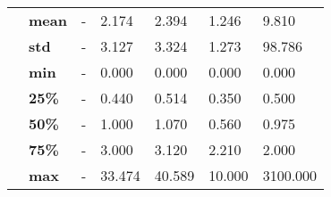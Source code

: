 \begin{tabularx}{\linewidth}{lXXXXXX}
           & \textbf{mean} &             - &      2.174 &       2.394 &              1.246 &     9.810 \\
           & \textbf{std} &             - &      3.127 &       3.324 &              1.273 &    98.786 \\
           & \textbf{min} &             - &      0.000 &       0.000 &              0.000 &     0.000 \\
           & \textbf{25\%} &             - &      0.440 &       0.514 &              0.350 &     0.500 \\
           & \textbf{50\%} &             - &      1.000 &       1.070 &              0.560 &     0.975 \\
           & \textbf{75\%} &             - &      3.000 &       3.120 &              2.210 &     2.000 \\
           & \textbf{max} &             - &     33.474 &      40.589 &             10.000 &  3100.000 \\
\bottomrule
\end{tabularx}
